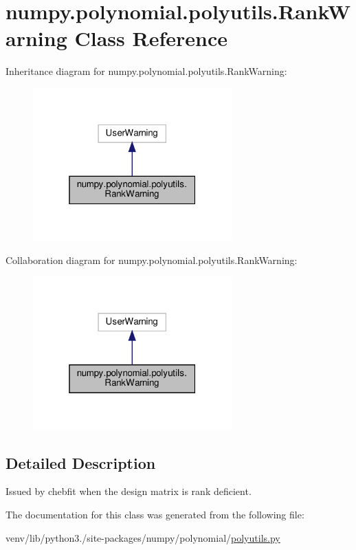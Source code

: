 \hypertarget{classnumpy_1_1polynomial_1_1polyutils_1_1RankWarning}{}\section{numpy.\+polynomial.\+polyutils.\+Rank\+Warning Class Reference}
\label{classnumpy_1_1polynomial_1_1polyutils_1_1RankWarning}


Inheritance diagram for numpy.\+polynomial.\+polyutils.\+Rank\+Warning\+:
\nopagebreak
\begin{figure}[H]
\begin{center}
\leavevmode
\includegraphics[width=217pt]{classnumpy_1_1polynomial_1_1polyutils_1_1RankWarning__inherit__graph}
\end{center}
\end{figure}


Collaboration diagram for numpy.\+polynomial.\+polyutils.\+Rank\+Warning\+:
\nopagebreak
\begin{figure}[H]
\begin{center}
\leavevmode
\includegraphics[width=217pt]{classnumpy_1_1polynomial_1_1polyutils_1_1RankWarning__coll__graph}
\end{center}
\end{figure}


\subsection{Detailed Description}
\begin{DoxyVerb}Issued by chebfit when the design matrix is rank deficient.\end{DoxyVerb}
 

The documentation for this class was generated from the following file\+:\begin{DoxyCompactItemize}
\item 
venv/lib/python3./site-\/packages/numpy/polynomial/\hyperlink{polyutils_8py}{polyutils.\+py}\end{DoxyCompactItemize}
